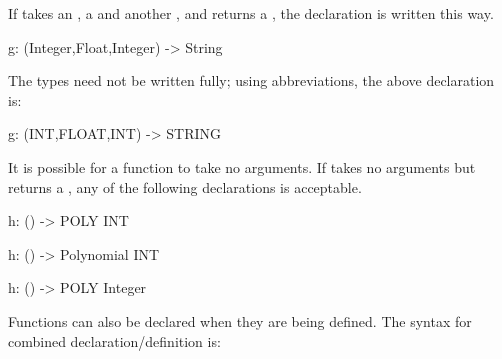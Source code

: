 \begin{xtc}
\begin{xtccomment}
If  takes an , a  and
another , and returns a
, the declaration is written this way.
\end{xtccomment}
\begin{spadsrc}
g: (Integer,Float,Integer) -> String
\end{spadsrc}
\end{xtc}
\begin{xtc}
\begin{xtccomment}
The types need not be written fully; using abbreviations, the above
declaration is:
\end{xtccomment}
\begin{spadsrc}
g: (INT,FLOAT,INT) -> STRING
\end{spadsrc}
\end{xtc}
\begin{xtc}
\begin{xtccomment}
It is possible for a function to take no arguments.
If  takes no arguments
but returns a  , any
of the following declarations is acceptable.
\end{xtccomment}
\begin{spadsrc}
h: () -> POLY INT
\end{spadsrc}
\end{xtc}
\begin{xtc}
\begin{xtccomment}
\end{xtccomment}
\begin{spadsrc}
h: () -> Polynomial INT
\end{spadsrc}
\end{xtc}
\begin{xtc}
\begin{xtccomment}
\end{xtccomment}
\begin{spadsrc}
h: () -> POLY Integer
\end{spadsrc}
\end{xtc}


\beginImportant
Functions can also be declared when they are being defined.
The syntax for combined declaration/definition is:
\begin{center}
\end{center}
\endImportant

